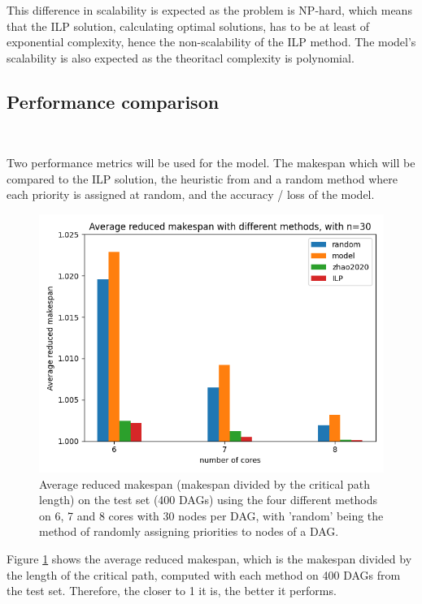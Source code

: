 This difference in scalability is expected as the problem is NP-hard,
which means that the ILP solution, calculating optimal solutions,
has to be at least of exponential complexity, hence the non-scalability of the ILP method.
The model's scalability is also expected as the theoritacl complexity
is polynomial.


\subsection{Performance comparison}
~

Two performance metrics will be used for the model.
The makespan which will be compared to the ILP solution, the heuristic
from \citet{zhao2020DAGsched} and a random method where each priority is assigned at random,
and the accuracy / loss of the model.

\begin{figure}
    \centering
    \includegraphics[width=\linewidth]{images/avg_makespan_n30.png}
    \caption{Average reduced makespan (makespan divided by the critical path length) on the test set (400 DAGs) using the four different methods
    on 6, 7 and 8 cores with 30 nodes per DAG,
    with 'random' being the method of randomly assigning priorities to nodes of a DAG.}
    \label{fig:avg_makespan_comparison_trained}
\end{figure}

Figure \ref{fig:avg_makespan_comparison_trained} shows the average
reduced makespan, which is the makespan divided by the length of the critical path,
computed with each method on 400 DAGs from the test set.
Therefore, the closer to 1 it is, the better it performs.


